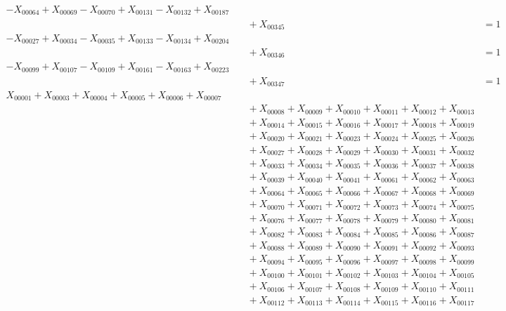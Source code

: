 \documentclass[a4paper,10pt]{article}
\begin{document}
{\begin{align}
-X_{00064} + X_{00069} - X_{00070} + X_{00131} - X_{00132} + X_{00187} \\[0.5ex]
&\quad  + X_{00345} &= 1 && \text{(R00114)} \\
-X_{00027} + X_{00034} - X_{00035} + X_{00133} - X_{00134} + X_{00204} \\[0.5ex]
&\quad  + X_{00346} &= 1 && \text{(R00115)} \\
-X_{00099} + X_{00107} - X_{00109} + X_{00161} - X_{00163} + X_{00223} \\[0.5ex]
&\quad  + X_{00347} &= 1 && \text{(R00116)} \\
X_{00001} + X_{00003} + X_{00004} + X_{00005} + X_{00006} + X_{00007} \\[0.5ex]
&\quad  + X_{00008} + X_{00009} + X_{00010} + X_{00011} + X_{00012} + X_{00013} \\[0.5ex]
&\quad  + X_{00014} + X_{00015} + X_{00016} + X_{00017} + X_{00018} + X_{00019} \\[0.5ex]
&\quad  + X_{00020} + X_{00021} + X_{00023} + X_{00024} + X_{00025} + X_{00026} \\[0.5ex]
&\quad  + X_{00027} + X_{00028} + X_{00029} + X_{00030} + X_{00031} + X_{00032} \\[0.5ex]
&\quad  + X_{00033} + X_{00034} + X_{00035} + X_{00036} + X_{00037} + X_{00038} \\[0.5ex]
&\quad  + X_{00039} + X_{00040} + X_{00041} + X_{00061} + X_{00062} + X_{00063} \\[0.5ex]
&\quad  + X_{00064} + X_{00065} + X_{00066} + X_{00067} + X_{00068} + X_{00069} \\[0.5ex]
&\quad  + X_{00070} + X_{00071} + X_{00072} + X_{00073} + X_{00074} + X_{00075} \\[0.5ex]
&\quad  + X_{00076} + X_{00077} + X_{00078} + X_{00079} + X_{00080} + X_{00081} \\[0.5ex]
&\quad  + X_{00082} + X_{00083} + X_{00084} + X_{00085} + X_{00086} + X_{00087} \\[0.5ex]
&\quad  + X_{00088} + X_{00089} + X_{00090} + X_{00091} + X_{00092} + X_{00093} \\[0.5ex]
&\quad  + X_{00094} + X_{00095} + X_{00096} + X_{00097} + X_{00098} + X_{00099} \\[0.5ex]
&\quad  + X_{00100} + X_{00101} + X_{00102} + X_{00103} + X_{00104} + X_{00105} \\[0.5ex]
&\quad  + X_{00106} + X_{00107} + X_{00108} + X_{00109} + X_{00110} + X_{00111} \\[0.5ex]
&\quad  + X_{00112} + X_{00113} + X_{00114} + X_{00115} + X_{00116} + X_{00117} \\[0.5ex]

\end{align}}
\end{document}

